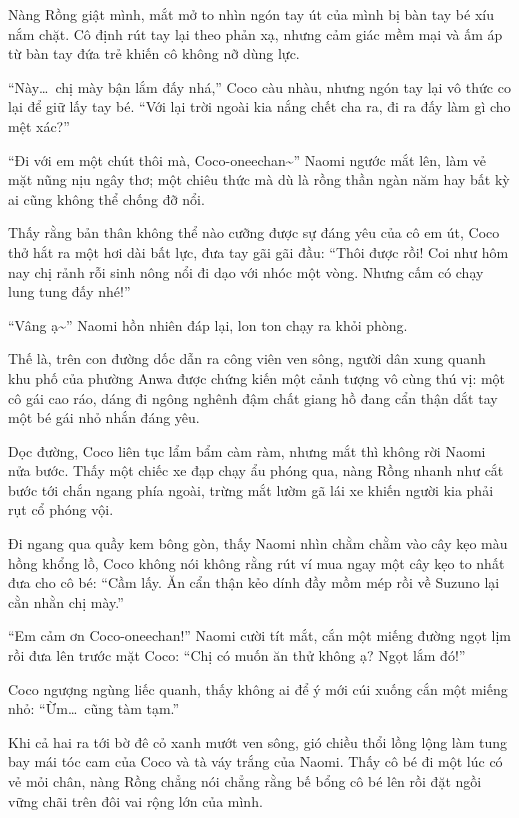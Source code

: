﻿\documentclass[../main.tex]{subfiles}
\begin{document}
Nàng Rồng giật mình, mắt mở to nhìn ngón tay út của mình bị bàn tay bé xíu nắm chặt. Cô định rút tay lại theo phản xạ, nhưng cảm giác mềm mại và ấm áp từ bàn tay đứa trẻ khiến cô không nỡ dùng lực.

``Này\dots\ chị mày bận lắm đấy nhá,'' Coco càu nhàu, nhưng ngón tay lại vô thức co lại để giữ lấy tay bé. ``Với lại trời ngoài kia nắng chết cha ra, đi ra đấy làm gì cho mệt xác?''

``Đi với em một chút thôi mà, Coco-oneechan\~{}'' Naomi ngước mắt lên, làm vẻ mặt nũng nịu ngây thơ; một chiêu thức mà dù là rồng thần ngàn năm hay bất kỳ ai cũng không thể chống đỡ nổi.

Thấy rằng bản thân không thể nào cưỡng được sự đáng yêu của cô em út, Coco thở hắt ra một hơi dài bất lực, đưa tay gãi gãi đầu: ``Thôi được rồi! Coi như hôm nay chị rảnh rỗi sinh nông nổi đi dạo với nhóc một vòng. Nhưng cấm có chạy lung tung đấy nhé!''

``Vâng ạ\~{}'' Naomi hồn nhiên đáp lại, lon ton chạy ra khỏi phòng.

Thế là, trên con đường dốc dẫn ra công viên ven sông, người dân xung quanh khu phố của phường Anwa được chứng kiến một cảnh tượng vô cùng thú vị: một cô gái cao ráo, dáng đi ngông nghênh đậm chất giang hồ đang cẩn thận dắt tay một bé gái nhỏ nhắn đáng yêu.

Dọc đường, Coco liên tục lẩm bẩm càm ràm, nhưng mắt thì không rời Naomi nửa bước. Thấy một chiếc xe đạp chạy ẩu phóng qua, nàng Rồng nhanh như cắt bước tới chắn ngang phía ngoài, trừng mắt lườm gã lái xe khiến người kia phải rụt cổ phóng vội.

Đi ngang qua quầy kem bông gòn, thấy Naomi nhìn chằm chằm vào cây kẹo màu hồng khổng lồ, Coco không nói không rằng rút ví mua ngay một cây kẹo to nhất đưa cho cô bé: ``Cầm lấy. Ăn cẩn thận kẻo dính đầy mồm mép rồi về Suzuno lại cằn nhằn chị mày.''

``Em cảm ơn Coco-oneechan!'' Naomi cười tít mắt, cắn một miếng đường ngọt lịm rồi đưa lên trước mặt Coco: ``Chị có muốn ăn thử không ạ? Ngọt lắm đó!''

Coco ngượng ngùng liếc quanh, thấy không ai để ý mới cúi xuống cắn một miếng nhỏ: ``Ừm\dots\ cũng tàm tạm.''

Khi cả hai ra tới bờ đê cỏ xanh mướt ven sông, gió chiều thổi lồng lộng làm tung bay mái tóc cam của Coco và tà váy trắng của Naomi. Thấy cô bé đi một lúc có vẻ mỏi chân, nàng Rồng chẳng nói chẳng rằng bế bổng cô bé lên rồi đặt ngồi vững chãi trên đôi vai rộng lớn của mình.
\end{document}
